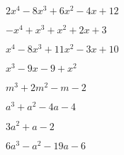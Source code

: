 \begin{esercizio}
\begin{enumeratea}
\item \(2 x^{4} - 8 x^{3} + 6 x^{2} - 4 x + 12\)
\item \(- x^{4} + x^{3} + x^{2} + 2 x + 3\)
\item \(x^{4} - 8 x^{3} + 11 x^{2} - 3 x + 10\)
% 
\item \(x^{3}-9x-9+x^{2}\)
\item \(m^{3}+2m^{2}-m-2\)
\item \(a^{3}+a^{2}-4a-4\)
\item \(3a^{2}+a-2\)
\item \(6a^{3}-a^{2}-19a-6\)
\end{enumeratea}
\end{esercizio}


